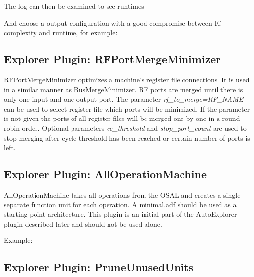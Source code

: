 \documentclass[a4paper,twoside]{tceusermanual}
\begin{document}
The log can then be examined to see runtimes:


And choose a output configuration with a good compromise between IC complexity and runtime, for example:



\subsection{Explorer Plugin: RFPortMergeMinimizer}

RFPortMergeMinimizer optimizes a machine's register file connections. It is used in a similar manner as BusMergeMinimizer. 
RF ports are merged until there is only one input and one output port. The parameter \textit{rf\_to\_merge=RF\_NAME}
can be used to select register file which ports will be minimized. If the parameter is not given
the ports of all register files will be merged one by one in a round-robin order. Optional parameters
\textit{cc\_threshold} and \textit{stop\_port\_count} are used to stop merging after cycle threshold has been reached or certain number of ports is left.







\subsection{Explorer Plugin: AllOperationMachine}

AllOperationMachine takes all operations from the OSAL and creates a single separate 
function unit for each operation. A 
minimal.adf should be used as a starting point architecture. This plugin is an 
initial part of the AutoExplorer plugin described later and should not be used alone.

Example:

\subsection{Explorer Plugin: PruneUnusedUnits}
\end{document}

